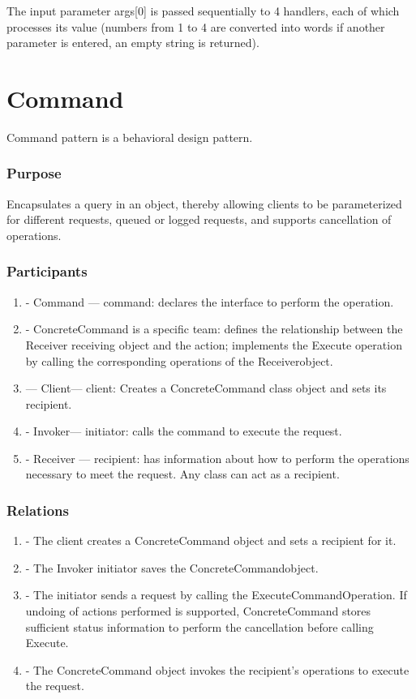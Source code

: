 \documentclass[12pt]{book}
\begin{document}
The input parameter args[0] is passed sequentially to 4 handlers, each of which processes its value (numbers from 1 to 4 are converted into words if another parameter is entered, an empty string is returned).

\section{Command}
Command pattern is a behavioral design pattern.

\subsubsection{Purpose}
Encapsulates a query in an object, thereby allowing clients to be parameterized  for different requests, queued or logged requests, and supports cancellation of operations.

\subsubsection{Participants}
\begin{enumerate}
    \item - Command — command: declares the interface to perform the operation.
    \item -	ConcreteCommand is a specific  team: defines the relationship between the Receiver receiving object and the action; implements the Execute operation by calling the corresponding operations of the  Receiverobject.
    \item — Client— client: Creates a ConcreteCommand class object and sets its recipient.
    \item - Invoker— initiator: calls the command to execute the request.
    \item - Receiver  — recipient: has information about how to perform the operations necessary to meet the request. Any class can act as a recipient.
\end{enumerate}

\subsubsection{Relations}
\begin{enumerate}
    \item - The client creates a ConcreteCommand object and sets a recipient for it.
    \item - The Invoker initiator saves the  ConcreteCommandobject.
    \item - The initiator sends a request by calling the ExecuteCommandOperation. If undoing of actions performed is supported, ConcreteCommand  stores sufficient status information to perform the cancellation before calling  Execute.
    \item - The ConcreteCommand  object  invokes the recipient's operations to execute the request.
\end{enumerate}
\end{document}
